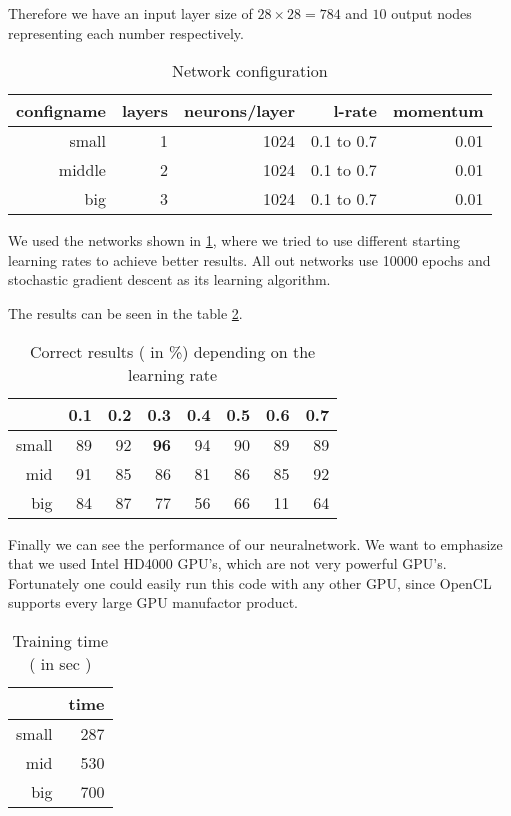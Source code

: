 \documentclass{acm_proc_article-sp}
\begin{document}
Therefore we have an input layer size of $28 \times 28= 784$ and $10$ output nodes representing each number respectively.

\begin{table}[h]
\centering
\caption{Network configuration}
\label{tab:config}
\begin{tabular}{rr|r|r|r}
\hline
configname & layers & neurons/layer& l-rate & momentum\\
\hline
small & 1 & 1024 & 0.1 to 0.7 & 0.01 \\
\hline
middle & 2 & 1024 & 0.1 to 0.7 & 0.01 \\
\hline
big & 3 & 1024 & 0.1 to 0.7 & 0.01\\
\hline
\end{tabular}
\end{table}
We used the networks shown in \ref{tab:config}, where we tried to use different starting learning rates to achieve better results.
All out networks use 10000 epochs and stochastic gradient descent as its learning algorithm.


The results can be seen in the table \ref{tab:correct}. 
\begin{table}[h]
\centering
\caption{Correct results ( in \%) depending on the learning rate}
\label{tab:correct}
\begin{tabular}{r|r|r|r|r|r|r|r}
& 0.1 & 0.2 & 0.3 & 0.4 & 0.5 & 0.6 & 0.7 \\
\hline
small & 89 & 92 & \textbf{96} & 94 & 90 & 89 & 89 \\
\hline
mid & 91 &85 & 86 & 81 & 86 & 85 & 92 \\
\hline
big & 84 & 87 & 77 & 56 & 66 & 11 & 64  \\
\end{tabular}
\end{table}

Finally we can see the performance of our neuralnetwork. We want to emphasize that we used Intel HD4000 GPU's, which are not very powerful GPU's. Fortunately one could easily run this code with any other GPU, since OpenCL supports every large GPU manufactor product.

\begin{table}[h]
\centering
\caption{Training time ( in sec )}
\label{tab:traintime}
\begin{tabular}{r|r}
& time \\
\hline
small & 287 \\
\hline
mid & 530 \\
\hline
big &  700 \\
\end{tabular}
\end{table}
\end{document}
